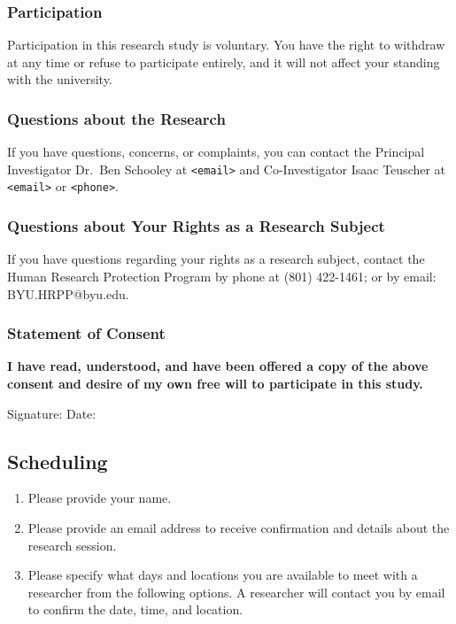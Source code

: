 \subsubsection*{Participation}
Participation in this research study is voluntary. You have the right to withdraw at any time or refuse to participate entirely, and it will not affect your standing with the university.

\subsubsection*{Questions about the Research}
If you have questions, concerns, or complaints, you can contact the Principal Investigator Dr.~Ben Schooley at \texttt{<email>} and Co-Investigator Isaac Teuscher at \texttt{<email>} or \texttt{<phone>}.

\subsubsection*{Questions about Your Rights as a Research Subject}
If you have questions regarding your rights as a research subject, contact the Human Research Protection Program by phone at (801) 422-1461; or by email: BYU.HRPP@byu.edu.

\subsubsection*{Statement of Consent}
\textbf{I have read, understood, and have been offered a copy of the above consent and desire of my own free will to participate in this study.}

\vspace{0.5cm}
\noindent Signature: \hrulefill \quad Date: \hrulefill

\subsection*{Scheduling}

\begin{enumerate}
    \item Please provide your name.
    \item Please provide an email address to receive confirmation and details about the research session.
    \item Please specify what days and locations you are available to meet with a researcher from the following options. A researcher will contact you by email to confirm the date, time, and location.
\end{enumerate}

